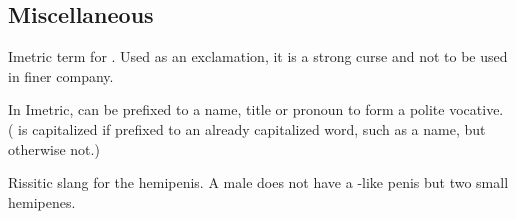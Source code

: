 \subsection{Miscellaneous}









\begin{gloss}
  
  
  
  \begin{comment}
  \subsubsection{A-G}
  \end{comment}
  
  
  
  \begin{comment}
  \paragraph{Becallios}
  \end{comment}
  Imetric term for . Used as an exclamation, it is a strong curse and not to be used in finer company. 
  
  
  
  \begin{comment}
  \paragraph{\dai}
  \end{comment}
  \gitem{\dai-}
  In Imetric, \quo{\dai-} can be prefixed to a name, title or pronoun to form a polite vocative. (\quo{\Dai-} is capitalized if prefixed to an already capitalized word, such as a name, but otherwise not.)
  
  
  
  
  
  
  \begin{comment}
  \paragraph{gness}
  \end{comment}
  Rissitic slang for the \scathaese{} hemipenis. A male \scatha{} does not have a \human{}-like penis but two small hemipenes. 
  

\end{gloss}
